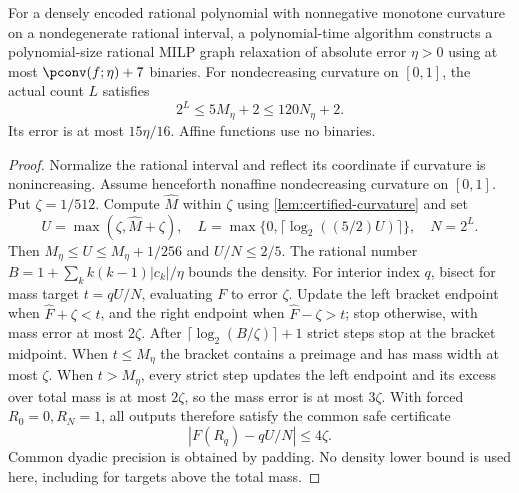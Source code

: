 \begin{theorem}\label{thm:compiled-curvature}
For a densely encoded rational polynomial with nonnegative monotone
curvature on a nondegenerate rational interval, a polynomial-time algorithm constructs
a polynomial-size rational MILP graph relaxation of absolute error
$\eta>0$ using at most $\pconv(f;\eta)+7$ binaries.
For nondecreasing curvature on $[0,1]$, the actual count $L$ satisfies
\begin{equation}\label{eq:compiled-mass-count}
 2^L\le5M_\eta+2\le120N_\eta+2.
\end{equation}
Its error is at most $15\eta/16$. Affine functions use no binaries.
\end{theorem}
\begin{proof}
Normalize the rational interval and reflect its coordinate if curvature
is nonincreasing. Assume henceforth nonaffine nondecreasing curvature on
$[0,1]$. Put $\zeta=1/512$. Compute $\widehat M$ within $\zeta$
using \cref{lem:certified-curvature} and set
\[
 U=\max(\zeta,\widehat M+\zeta),\quad
 L=\max\{0,\lceil\log_2((5/2)U)\rceil\},\quad N=2^L.
\]
Then $M_\eta\le U\le M_\eta+1/256$ and $U/N\le2/5$.
The rational number $B=1+\sum_k k(k-1)|c_k|/\eta$ bounds the
density. For interior index $q$, bisect for mass target $t=qU/N$,
evaluating $F$ to error $\zeta$. Update the left bracket endpoint when
$\widehat F+\zeta<t$, and the right endpoint when
$\widehat F-\zeta>t$; stop
otherwise, with mass error at most $2\zeta$. After
$\lceil\log_2(B/\zeta)\rceil+1$ strict steps stop at the bracket
midpoint. When $t\le M_\eta$ the bracket contains a preimage and
has mass width at most $\zeta$. When $t>M_\eta$, every strict step
updates the left endpoint and its excess over total mass is at most $2\zeta$, so
the mass error is at most $3\zeta$. With forced $R_0=0,R_N=1$,
all outputs therefore satisfy the common safe certificate
\begin{equation}\label{eq:mass-knot-certificate}
 |F(R_q)-qU/N|\le4\zeta.
\end{equation}
Common dyadic precision is obtained by padding. No density lower bound
is used here, including for targets above the total mass.


\end{proof}
